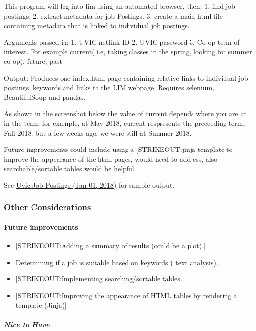 This program will log into lim using an automated browser, then: 1. find
job postings, 2. extract metadata for job Postings. 3. create a main
html file containing metadata that is linked to individual job postings.

Arguments passed in: 1. UVIC netlink ID 2. UVIC password 3. Co-op term
of interest. For example current( i.e, taking classes in the spring,
looking for summer co-op), future, past

Output: Produces one index.html page containing relative links to
individual job postings, keywords and links to the LIM webpage. Requires
selenium, BeautifulSoup and pandas.

As shown in the screenshot below the value of current depends where you
are at in the term, for example, at May 2018, current respresents the
preceeding term, Fall 2018, but a few weeks ago, we were still at Summer
2018.

Future improvements could include using a {[}STRIKEOUT:jinja template to
improve the appearance of the html pages, would need to add css, also
searchable/sortable tables would be helpful.{]}

See \href{https://web.uvic.ca/~lidavid/jobScrapping/LIMScrap/}{Uvic Job
Postings (Jan 01, 2018)} for sample output.


\subsubsection{Other Considerations}\label{other-considerations}

\paragraph{Future improvements}\label{future-improvements}

\begin{itemize}

\item
  {[}STRIKEOUT:Adding a summary of results (could be a plot).{]}
\item
  Determining if a job is suitable based on keywords ( text analysis).
\item
  {[}STRIKEOUT:Implementing searching/sortable tables.{]}
\item
  {[}STRIKEOUT:Improving the appearance of HTML tables by rendering a
  template (Jinja){]}
\end{itemize}


\subparagraph{Nice to Have}\label{nice-to-have}

